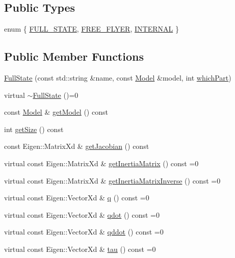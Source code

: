\subsection*{Public Types}
\begin{DoxyCompactItemize}
\item 
enum \{ \hyperlink{classocra_1_1FullState_a8623fb06b8930505d950f7651e75b519af5d38d391c1a3c23006d51e6db4adea8}{F\+U\+L\+L\+\_\+\+S\+T\+A\+TE}, 
\hyperlink{classocra_1_1FullState_a8623fb06b8930505d950f7651e75b519a2b23349d3727ddf8b0d10a6c06dfcc31}{F\+R\+E\+E\+\_\+\+F\+L\+Y\+ER}, 
\hyperlink{classocra_1_1FullState_a8623fb06b8930505d950f7651e75b519a6c76abe0ec381b256a1e2429308126a5}{I\+N\+T\+E\+R\+N\+AL}
 \}
\end{DoxyCompactItemize}
\subsection*{Public Member Functions}
\begin{DoxyCompactItemize}
\item 
\hyperlink{classocra_1_1FullState_ae30ccfdd99c72531c1218b270d00c5df}{Full\+State} (const std\+::string \&name, const \hyperlink{classocra_1_1Model}{Model} \&model, int \hyperlink{classocra_1_1FullState_a75ec7c039df8cb8608ebf34f7b779be5}{which\+Part})
\item 
virtual \hyperlink{classocra_1_1FullState_a7392bab88e107fe2862c01eb9c9bc1a4}{$\sim$\+Full\+State} ()=0
\item 
const \hyperlink{classocra_1_1Model}{Model} \& \hyperlink{classocra_1_1FullState_a97f2718a0f72e69c829d67db4514af68}{get\+Model} () const
\item 
int \hyperlink{classocra_1_1FullState_a64f03f9385b36840d23e06de18a40112}{get\+Size} () const
\item 
const Eigen\+::\+Matrix\+Xd \& \hyperlink{classocra_1_1FullState_ada4a4e3af758b4af2ba95516eaad74e1}{get\+Jacobian} () const
\item 
virtual const Eigen\+::\+Matrix\+Xd \& \hyperlink{classocra_1_1FullState_a5d5c2ddfaf4868f78b4621d27b500784}{get\+Inertia\+Matrix} () const =0
\item 
virtual const Eigen\+::\+Matrix\+Xd \& \hyperlink{classocra_1_1FullState_a10f3a888554035bf13b3f636ce4b4edc}{get\+Inertia\+Matrix\+Inverse} () const =0
\item 
virtual const Eigen\+::\+Vector\+Xd \& \hyperlink{classocra_1_1FullState_a3bb03b513d7cb3a5447d1d4eb2d643b0}{q} () const =0
\item 
virtual const Eigen\+::\+Vector\+Xd \& \hyperlink{classocra_1_1FullState_a7018fe03dc3c8b3ec95d3c2015ae60e6}{qdot} () const =0
\item 
virtual const Eigen\+::\+Vector\+Xd \& \hyperlink{classocra_1_1FullState_a5882a53273cd9d3baae36b5850deadae}{qddot} () const =0
\item 
virtual const Eigen\+::\+Vector\+Xd \& \hyperlink{classocra_1_1FullState_a24723b4a382c2bf51e6c32cbd1bd7b06}{tau} () const =0
\end{DoxyCompactItemize}
